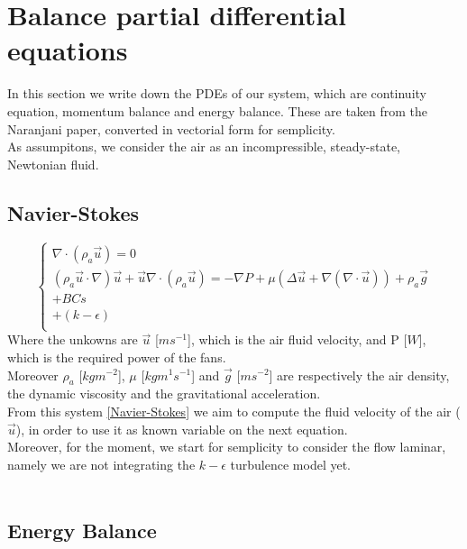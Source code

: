 \section{Balance partial differential equations}
	
In this section we write down the PDEs of our system, which are continuity equation, momentum balance and energy balance. These are taken from the Naranjani paper, converted in vectorial form for semplicity.\\
As assumpitons, we consider the air as an incompressible, steady-state, Newtonian fluid.
	
\subsection{Navier-Stokes}
	
\begin{equation} \label{Navier-Stokes}
	\begin{cases}
		\nabla\cdot( \rho_a \vec{u} ) = 0  \\
		(\rho_a\vec{u}\cdot\nabla)\vec{u} + \vec{u}\nabla\cdot(\rho_a\vec{u}) = - \nabla P + \mu(\Delta\vec{u} + \nabla(\nabla\cdot\vec{u} )) + \rho_a\vec{g} \\
		+ BCs \\
		+ (k-\epsilon) \\
	\end{cases}	
\end{equation}
Where the unkowns are $\vec{u}$ [$ms^{-1}$], which is the air fluid velocity, and P [$W$], which is the required power of the fans.\\
Moreover $\rho_a$ [$kg m^{-2}$], $\mu$ [$kg m^{1} s^{-1}$] and $\vec{g}$ [$ms^{-2}$] are respectively the air density, the dynamic viscosity and the gravitational acceleration.\\
From this system \eqref{Navier-Stokes} we aim to compute the fluid velocity of the air ($\vec{u}$), in order to use it as known variable on the next equation.\\
Moreover, for the moment, we start for semplicity to consider the flow laminar, namely we are not integrating the $k-\epsilon$ turbulence model yet.\\
\
\subsection{Energy Balance}
	
